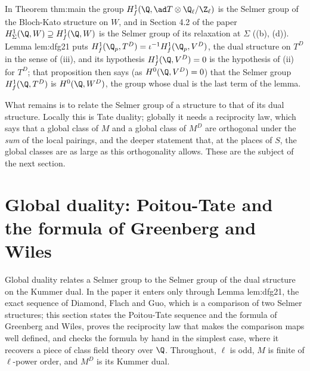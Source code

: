 \begin{paperlink}\label{pl:galcoh:structures}
In Theorem thm:main the group $H^1_f(\Q,\ad T\otimes\Q_\ell/\Z_\ell)$ is the Selmer group of the Bloch-Kato structure on $W$, and in Section 4.2 of the paper
$H^1_\Sigma(\Q,W)\supseteq H^1_f(\Q,W)$ is the Selmer group of its relaxation at $\Sigma$ ((b), (d)). Lemma lem:dfg21 puts
$H^1_f(\Q_p,T^D)=\iota^{-1}H^1_f(\Q_p,V^D)$, the dual structure on $T^D$ in the sense of (iii), and its hypothesis $H^1_f(\Q,V^D)=0$ is
the hypothesis of (ii) for $T^D$; that proposition then says (as $H^0(\Q,V^D)=0$) that the Selmer group $H^1_f(\Q,T^D)$ is $H^0(\Q,W^D)$, the group whose dual is
the last term of the lemma.
\end{paperlink}

What remains is to relate the Selmer group of a structure to that of its dual structure. Locally this is Tate duality; globally it needs a reciprocity law, which says
that a global class of $M$ and a global class of $M^D$ are orthogonal under the \emph{sum} of the local pairings, and the deeper statement that, at the places of $S$, the
global classes are as large as this orthogonality allows. These are the subject of the next section.
\section[Global duality]{Global duality: Poitou-Tate and the formula of Greenberg and Wiles}\label{sec:galcoh:global-duality}

Global duality relates a Selmer group to the Selmer group of the dual structure on the Kummer dual. In the paper it enters only through Lemma lem:dfg21, the
exact sequence of Diamond, Flach and Guo, which is a comparison of two Selmer structures; this section states the Poitou-Tate sequence and the formula of Greenberg
and Wiles, proves the reciprocity law that makes the comparison maps well defined, and checks the formula by hand in the simplest case, where it recovers a
piece of class field theory over $\Q$. Throughout, $\ell$ is odd, $M$ is finite of $\ell$-power order, and $M^D$ is its Kummer dual.


